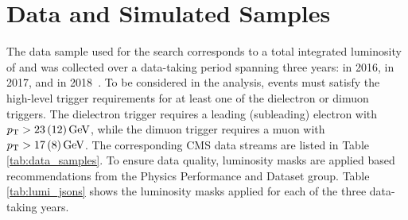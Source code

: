 \chapter{Data and Simulated Samples}
The data sample used for the \hzg search corresponds to a total integrated luminosity of \LumiT\fbinv and was collected over a data-taking period spanning three years: \Lumia\fbinv in 2016, \Lumib\fbinv in 2017, and \Lumic\fbinv in 2018~\cite{CMS-LUM-17-003,LUM-17-004,LUM-18-002}. 
To be considered in the analysis, events must satisfy the high-level trigger requirements for at least one of the dielectron or dimuon triggers.
The dielectron trigger requires a leading (subleading) electron with
$p_{\mathrm{T}} > 23\,(12)\,\text{Ge\hspace{-.08em}V}$, while the dimuon trigger requires a muon with $p_{\mathrm{T}} > 17\,(8)\,\text{Ge\hspace{-.08em}V}$.
The corresponding CMS data streams are listed in Table \ref{tab:data_samples}. To ensure data quality, luminosity masks are applied based recommendations from the Physics Performance and Dataset group. Table \ref{tab:lumi_jsons} shows the luminosity masks applied for each of the three data-taking years.

